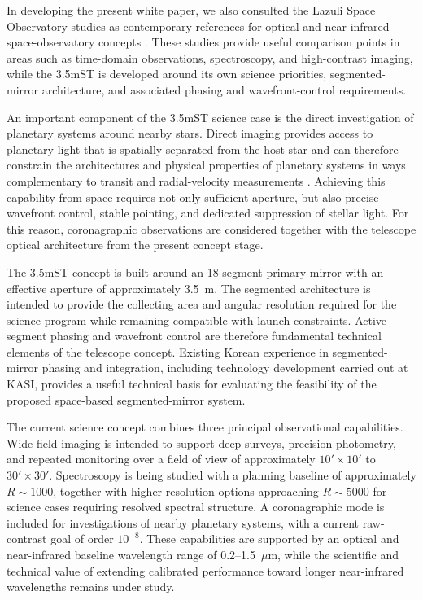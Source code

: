 In developing the present white paper, we also consulted the Lazuli Space Observatory studies as contemporary references for optical and near-infrared space-observatory concepts \cite{roy2026,wevers2026}. These studies provide useful comparison points in areas such as time-domain observations, spectroscopy, and high-contrast imaging, while the 3.5mST is developed around its own science priorities, segmented-mirror architecture, and associated phasing and wavefront-control requirements.

An important component of the 3.5mST science case is the direct investigation of planetary systems around nearby stars. Direct imaging provides access to planetary light that is spatially separated from the host star and can therefore constrain the architectures and physical properties of planetary systems in ways complementary to transit and radial-velocity measurements \cite{zurlo2024}. Achieving this capability from space requires not only sufficient aperture, but also precise wavefront control, stable pointing, and dedicated suppression of stellar light. For this reason, coronagraphic observations are considered
together with the telescope optical architecture from the present concept stage.

The 3.5mST concept is built around an 18-segment primary mirror with an
effective aperture of approximately 3.5~m. The segmented architecture is
intended to provide the collecting area and angular resolution required
for the science program while remaining compatible with launch constraints.
Active segment phasing and wavefront control are therefore fundamental
technical elements of the telescope concept. 
Existing Korean experience in segmented-mirror phasing and integration,
including technology development carried out at KASI, provides a useful
technical basis for evaluating the feasibility of the proposed space-based
segmented-mirror system.

The current science concept combines three principal observational
capabilities. Wide-field imaging is intended to support deep surveys,
precision photometry, and repeated monitoring over a field of view of
approximately $10' \times 10'$ to $30' \times 30'$. Spectroscopy is being
studied with a planning baseline of approximately $R \sim 1000$, together
with higher-resolution options approaching $R \sim 5000$ for science cases
requiring resolved spectral structure. A coronagraphic mode is included
for investigations of nearby planetary systems, with a current raw-contrast
goal of order $10^{-8}$. These capabilities are supported by an optical
and near-infrared baseline wavelength range of 0.2--1.5~$\mu$m, while the
scientific and technical value of extending calibrated performance toward
longer near-infrared wavelengths remains under study.

